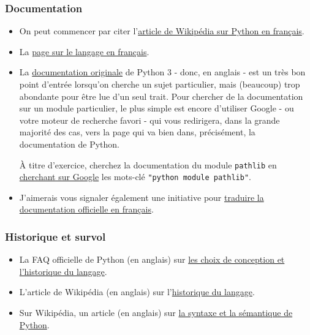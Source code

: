     \hypertarget{documentation}{%
\subsubsection{Documentation}\label{documentation}}

    \begin{itemize}
\item
  On peut commencer par citer
  l'\href{http://fr.wikipedia.org/wiki/Python_\%28langage\%29}{article
  de Wikipédia sur Python en français}.
\item
  La \href{https://wiki.python.org/moin/FrenchLanguage}{page sur le
  langage en français}.
\item
  La \href{https://docs.python.org/3/}{documentation originale} de
  Python 3 - donc, en anglais - est un très bon point d'entrée lorsqu'on
  cherche un sujet particulier, mais (beaucoup) trop abondante pour être
  lue d'un seul trait. Pour chercher de la documentation sur un module
  particulier, le plus simple est encore d'utiliser Google - ou votre
  moteur de recherche favori - qui vous redirigera, dans la grande
  majorité des cas, vers la page qui va bien dans, précisément, la
  documentation de Python.

  À titre d'exercice, cherchez la documentation du module
  \texttt{pathlib} en
  \href{https://www.google.fr/search?q=python+module+pathlib}{cherchant
  sur Google} les mots-clé \texttt{"python\ module\ pathlib"}.
\item
  J'aimerais vous signaler également une initiative pour
  \href{https://docs.python.org/fr/3/}{traduire la documentation
  officielle en français}.
\end{itemize}

    \hypertarget{historique-et-survol}{%
\subsubsection{Historique et survol}\label{historique-et-survol}}

    \begin{itemize}
\tightlist
\item
  La FAQ officielle de Python (en anglais) sur
  \href{https://docs.python.org/3/faq/design.html}{les choix de
  conception et l'historique du langage}.
\item
  L'article de Wikipédia (en anglais) sur
  l'\href{http://en.wikipedia.org/wiki/History_of_Python}{historique du
  langage}.
\item
  Sur Wikipédia, un article (en anglais) sur
  \href{http://en.wikipedia.org/wiki/Python_syntax_and_semantics}{la
  syntaxe et la sémantique de Python}.
\end{itemize}

